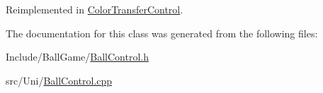 Reimplemented in \hyperlink{classColorTransferControl_acbe9581f0be7624c9bc33d40e2ee1a6b}{ColorTransferControl}.

The documentation for this class was generated from the following files:\begin{DoxyCompactItemize}
\item 
Include/BallGame/\hyperlink{BallControl_8h}{BallControl.h}\item 
src/Uni/\hyperlink{BallControl_8cpp}{BallControl.cpp}\end{DoxyCompactItemize}
